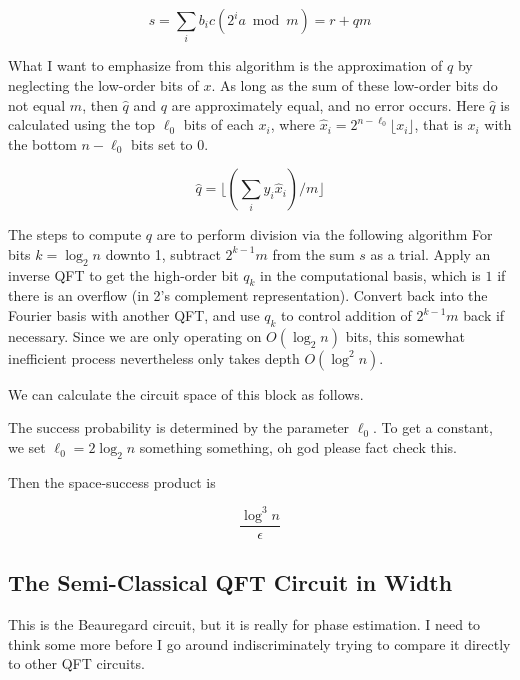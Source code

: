 \begin{equation}
s = \sum_i b_i c (2^i a \bmod m) = r + qm
\end{equation}

What I want to emphasize from this algorithm is the approximation of
$q$ by neglecting the low-order bits of $x$. As long as the sum of these
low-order bits do not equal $m$, then $\hat{q}$ and $q$ are approximately
equal, and no error occurs. Here $\hat{q}$ is calculated using the
top $\ell_0$ bits of each $x_i$, where
$\hat{x}_i = 2^{n-\ell_0}\lfloor x_i \rfloor$, that is $x_i$ with the
bottom $n-\ell_0$ bits set to 0.

\begin{equation}
\hat{q} = \lfloor (\sum_{i} y_i \hat{x}_i ) / m \rfloor
\end{equation}

The steps to compute $q$ are to perform division via the following algorithm
For bits $k = \log_2 n$ downto 1, subtract $2^{k-1}m$ from the sum $s$ as a
trial. Apply an inverse QFT to get the high-order bit
$q_k$ in the computational
basis, which is $1$ if there is an overflow (in 2's complement representation).
Convert back into the Fourier basis with another QFT, and use $q_k$ to
control addition of $2^{k-1}m$ back if necessary.
Since we are only operating on $O(\log_2 n)$ bits, this somewhat inefficient
process nevertheless only takes depth $O(\log^2 n)$.

We can calculate the circuit space of this block as follows.

The success probability is determined by the parameter $\ell_0$. To get
a constant, we set $\ell_0 = 2\log_2 n$ something something, oh god please
fact check this.

Then the space-success product is

\begin{equation}
\frac{\log^3 n}{\epsilon}
\end{equation}


\subsection{The Semi-Classical QFT Circuit in Width}

This is the Beauregard circuit, but it is really for phase estimation.
I need to think some more before I go around indiscriminately trying to compare
it directly to other QFT circuits.

